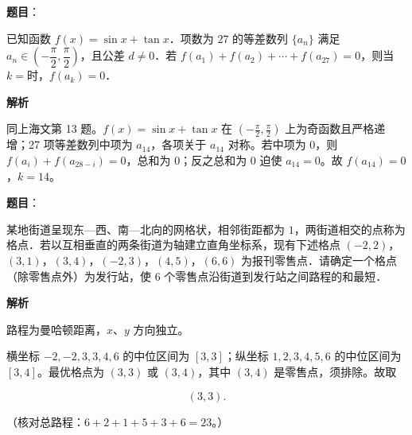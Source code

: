 \begin{answer}

\textbf{题目}：

已知函数 $f(x)=\sin x+\tan x$．项数为 $27$ 的等差数列 $\{a_n\}$ 满足 $a_n\in\left(-\dfrac{\pi}{2},\dfrac{\pi}{2}\right)$，且公差 $d\neq0$．若 $f(a_1)+f(a_2)+\cdots+f(a_{27})=0$，则当 $k=$\gkblank{}时，$f(a_k)=0$．

\textbf{解析}

同上海文第 13 题。$f(x)=\sin x+\tan x$ 在 $\left(-\frac\pi2,\frac\pi2\right)$ 上为奇函数且严格递增；27 项等差数列中项为 $a_{14}$，各项关于 $a_{14}$ 对称。若中项为 $0$，则 $f(a_i)+f(a_{28-i})=0$，总和为 $0$；反之总和为 $0$ 迫使 $a_{14}=0$。故 $f(a_{14})=0$，$k=14$。


\end{answer}
\begin{answer}

\textbf{题目}：

某地街道呈现东—西、南—北向的网格状，相邻街距都为 $1$，两街道相交的点称为格点．若以互相垂直的两条街道为轴建立直角坐标系，现有下述格点 $(-2,2)$，$(3,1)$，$(3,4)$，$(-2,3)$，$(4,5)$，$(6,6)$ 为报刊零售点．请确定一个格点（除零售点外）\gkblank{}为发行站，使 $6$ 个零售点沿街道到发行站之间路程的和最短．

\textbf{解析}

路程为曼哈顿距离，$x$、$y$ 方向独立。

横坐标 $-2,-2,3,3,4,6$ 的中位区间为 $[3,3]$；纵坐标 $1,2,3,4,5,6$ 的中位区间为 $[3,4]$。最优格点为 $(3,3)$ 或 $(3,4)$，其中 $(3,4)$ 是零售点，须排除。故取

\nopagebreak[4]
\[(3,3).\]

（核对总路程：$6+2+1+5+3+6=23$。）


\end{answer}
